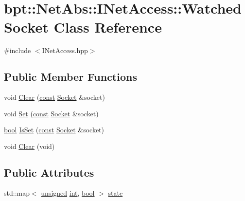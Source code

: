 \hypertarget{classbpt_1_1_net_abs_1_1_i_net_access_1_1_watched_socket}{\section{bpt\-:\-:Net\-Abs\-:\-:I\-Net\-Access\-:\-:Watched\-Socket Class Reference}
\label{classbpt_1_1_net_abs_1_1_i_net_access_1_1_watched_socket}
}


{\ttfamily \#include $<$I\-Net\-Access.\-hpp$>$}

\subsection*{Public Member Functions}
\begin{DoxyCompactItemize}
\item 
void \hyperlink{classbpt_1_1_net_abs_1_1_i_net_access_1_1_watched_socket_a63fe3294e9663d73daf3f7c6865de68f}{Clear} (\hyperlink{term__entry_8h_a57bd63ce7f9a353488880e3de6692d5a}{const} \hyperlink{classbpt_1_1_net_abs_1_1_i_net_access_ae5a8cad46f8006b85b535f126b697efc}{Socket} \&socket)
\item 
void \hyperlink{classbpt_1_1_net_abs_1_1_i_net_access_1_1_watched_socket_a542cab138c638eb2deae08c67f4f48d5}{Set} (\hyperlink{term__entry_8h_a57bd63ce7f9a353488880e3de6692d5a}{const} \hyperlink{classbpt_1_1_net_abs_1_1_i_net_access_ae5a8cad46f8006b85b535f126b697efc}{Socket} \&socket)
\item 
\hyperlink{term__entry_8h_a002004ba5d663f149f6c38064926abac}{bool} \hyperlink{classbpt_1_1_net_abs_1_1_i_net_access_1_1_watched_socket_ae372b67451e715be5583266eada9ccc1}{Is\-Set} (\hyperlink{term__entry_8h_a57bd63ce7f9a353488880e3de6692d5a}{const} \hyperlink{classbpt_1_1_net_abs_1_1_i_net_access_ae5a8cad46f8006b85b535f126b697efc}{Socket} \&socket)
\item 
void \hyperlink{classbpt_1_1_net_abs_1_1_i_net_access_1_1_watched_socket_ae92ab0cfab2304a0801793563cdcb881}{Clear} (void)
\end{DoxyCompactItemize}
\subsection*{Public Attributes}
\begin{DoxyCompactItemize}
\item 
std\-::map$<$ \hyperlink{curses_8priv_8h_aca40206900cfc164654362fa8d4ad1e6}{unsigned} \hyperlink{term__entry_8h_ad65b480f8c8270356b45a9890f6499ae}{int}, \hyperlink{term__entry_8h_a002004ba5d663f149f6c38064926abac}{bool} $>$ \hyperlink{classbpt_1_1_net_abs_1_1_i_net_access_1_1_watched_socket_a69f40a31db7a0252645ceeaf4fd50118}{state}
\end{DoxyCompactItemize}


